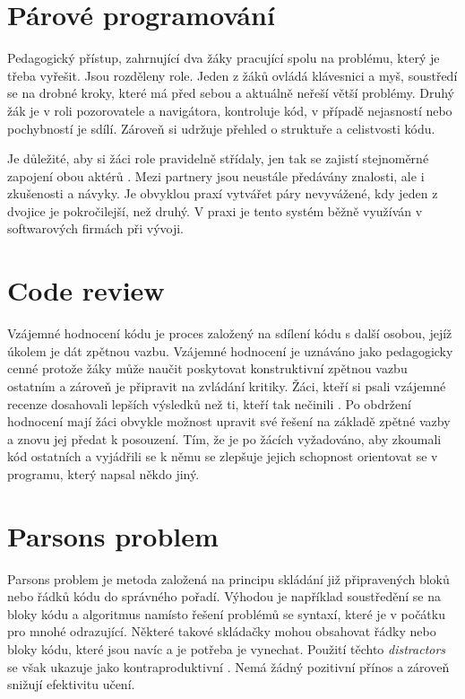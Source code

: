 \documentclass[
  digital,     %
  oneside,     %
  nosansbold,  %
  colorbold, %
  lof,         %
  nolot,         %
]{fithesis4}
\begin{document}
\section{Párové programování}
Pedagogický přístup, zahrnující dva žáky pracující spolu na problému, který je třeba vyřešit. Jsou rozděleny role. Jeden z žáků ovládá klávesnici a myš, soustředí se na drobné kroky, které má před sebou a aktuálně neřeší větší problémy. Druhý žák je v roli pozorovatele a navigátora, kontroluje kód, v případě nejasností nebo pochybností je sdílí. Zároveň si udržuje přehled o struktuře a celistvosti kódu.

Je důležité, aby si žáci role pravidelně střídaly, jen tak se zajistí stejnoměrné zapojení obou aktérů \cite{Hanks11}. Mezi partnery jsou neustále předávány znalosti, ale i zkušenosti a návyky. Je obvyklou praxí vytvářet páry nevyvážené, kdy jeden z dvojice je pokročilejší, než druhý. V praxi je tento systém běžně využíván v softwarových firmách při vývoji.

\section{Code review}
Vzájemné hodnocení kódu je proces založený na sdílení kódu s další osobou, jejíž úkolem je dát zpětnou vazbu. Vzájemné hodnocení je uznáváno jako pedagogicky cenné protože žáky může naučit poskytovat konstruktivní zpětnou vazbu ostatním a zároveň je připravit na zvládání kritiky. Žáci, kteří si psali vzájemné recenze dosahovali lepších výsledků než ti, kteří tak nečinili \cite{Hundhausen13}. Po obdržení hodnocení mají žáci obvykle možnost upravit své řešení na základě zpětné vazby a znovu jej předat k posouzení. Tím, že je po žácích vyžadováno, aby zkoumali kód ostatních a vyjádřili se k němu se zlepšuje jejich schopnost orientovat se v programu, který napsal někdo jiný. 

\section{Parsons problem}
Parsons problem je metoda založená na principu skládání již připravených bloků nebo řádků kódu do správného pořadí. Výhodou je například soustředění se na bloky kódu a algoritmus namísto řešení problémů se syntaxí, které je v počátku pro mnohé odrazující. Některé takové skládačky mohou obsahovat řádky nebo bloky kódu, které jsou navíc a je potřeba je vynechat. Použití těchto \textit{distractors} se však ukazuje jako kontraproduktivní \cite{Harms16}. Nemá žádný pozitivní přínos a zároveň snižují efektivitu učení.
\end{document}
